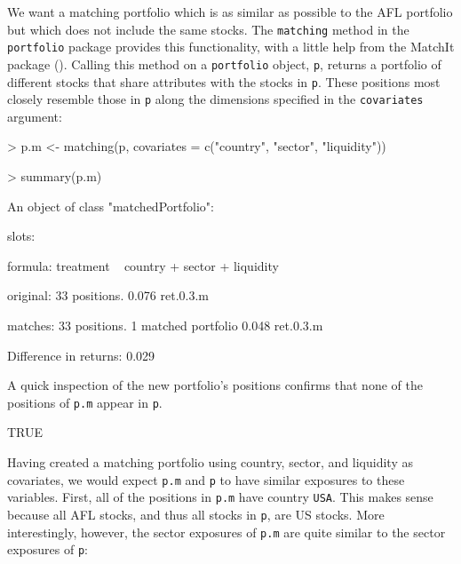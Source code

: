 \documentclass{article}
\begin{document}
We want a matching portfolio which is as similar as possible to the
AFL portfolio but which does not include the same stocks.  The
\texttt{matching} method in the \texttt{portfolio} package provides
this functionality, with a little help from the MatchIt package
(\cite{matchit.pkg}).  Calling this method on a \texttt{portfolio}
object, \texttt{p}, returns a portfolio of different stocks that share
attributes with the stocks in \texttt{p}.  These positions most
closely resemble those in \texttt{p} along the dimensions specified in
the \texttt{covariates} argument:

\begin{Schunk}
\begin{Sinput}
> p.m <- matching(p, covariates = c("country", "sector", "liquidity"))
\end{Sinput}
\end{Schunk}
\begin{Schunk}
\begin{Sinput}
> summary(p.m)
\end{Sinput}
\begin{Soutput}
An object of class "matchedPortfolio":

slots:

formula: treatment ~ country + sector + liquidity


original:
   33 positions. 
   0.076 ret.0.3.m 

matches: 
   33 positions. 
   1 matched portfolio 
   0.048 ret.0.3.m 

Difference in returns: 0.029 
\end{Soutput}
\end{Schunk}

A quick inspection of the new portfolio's positions confirms that none
of the positions of \texttt{p.m} appear in \texttt{p}.

\begin{Schunk}
\begin{Soutput}
[1] TRUE
\end{Soutput}
\end{Schunk}

Having created a matching portfolio using country, sector, and
liquidity as covariates, we would expect \texttt{p.m} and \texttt{p}
to have similar exposures to these variables.  First, all of the
positions in \texttt{p.m} have country \texttt{USA}.  This makes sense
because all AFL stocks, and thus all stocks in \texttt{p}, are US
stocks.  More interestingly, however, the sector exposures of
\texttt{p.m} are quite similar to the sector exposures of \texttt{p}:
\end{document}
